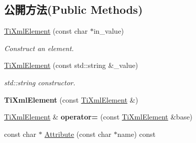 \subsection*{公開方法(Public Methods)}
\begin{DoxyCompactItemize}
\item 
\hyperlink{class_ti_xml_element_a01bc3ab372d35da08efcbbe65ad90c60}{Ti\+Xml\+Element} (const char $\ast$in\+\_\+value)\hypertarget{class_ti_xml_element_a01bc3ab372d35da08efcbbe65ad90c60}{}\label{class_ti_xml_element_a01bc3ab372d35da08efcbbe65ad90c60}

\begin{DoxyCompactList}\small\item\em Construct an element. \end{DoxyCompactList}\item 
\hyperlink{class_ti_xml_element_a40fc2e3c1a955e2f78e1a32350d180e7}{Ti\+Xml\+Element} (const std\+::string \&\+\_\+value)\hypertarget{class_ti_xml_element_a40fc2e3c1a955e2f78e1a32350d180e7}{}\label{class_ti_xml_element_a40fc2e3c1a955e2f78e1a32350d180e7}

\begin{DoxyCompactList}\small\item\em std\+::string constructor. \end{DoxyCompactList}\item 
{\bfseries Ti\+Xml\+Element} (const \hyperlink{class_ti_xml_element}{Ti\+Xml\+Element} \&)\hypertarget{class_ti_xml_element_a1ca4465f3c2eac6a60e641cd7f1d9f7e}{}\label{class_ti_xml_element_a1ca4465f3c2eac6a60e641cd7f1d9f7e}

\item 
\hyperlink{class_ti_xml_element}{Ti\+Xml\+Element} \& {\bfseries operator=} (const \hyperlink{class_ti_xml_element}{Ti\+Xml\+Element} \&base)\hypertarget{class_ti_xml_element_ad58d300f4cfc0016ffa6861ebb718a0b}{}\label{class_ti_xml_element_ad58d300f4cfc0016ffa6861ebb718a0b}

\item 
const char $\ast$ \hyperlink{class_ti_xml_element_ac1e4691e9375ba4e665dce7e46a50a9c}{Attribute} (const char $\ast$name) const \hypertarget{class_ti_xml_element_ac1e4691e9375ba4e665dce7e46a50a9c}{}\label{class_ti_xml_element_ac1e4691e9375ba4e665dce7e46a50a9c}


\end{DoxyCompactItemize}
